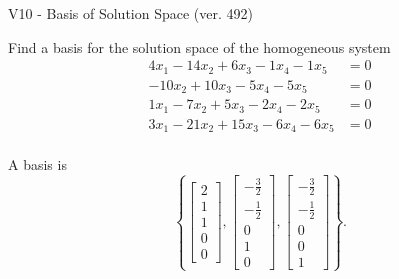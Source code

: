 \begin{exercise}
  \begin{exerciseTitle}V10 - Basis of Solution Space (ver. 492)\end{exerciseTitle}
  \begin{exerciseStatement}
    Find a basis for the solution space of the homogeneous system 
\begin{align*}
 4 x_ 1 -14 x_ 2 + 6 x_ 3 -1 x_ 4 -1 x_ 5 &= 0  \\ 
  -10 x_ 2 + 10 x_ 3 -5 x_ 4 -5 x_ 5 &= 0  \\ 
  1 x_ 1 -7 x_ 2 + 5 x_ 3 -2 x_ 4 -2 x_ 5 &= 0  \\ 
  3 x_ 1 -21 x_ 2 + 15 x_ 3 -6 x_ 4 -6 x_ 5 &= 0  \\ 
 \end{align*}


 
  \end{exerciseStatement}

  \begin{exerciseAnswer}
   A basis is   
\[\left\{\left[\begin{array}{c}
2 \\
1 \\
1 \\
0 \\
0
\end{array}\right] , \left[\begin{array}{c}
-\frac{3}{2} \\
-\frac{1}{2} \\
0 \\
1 \\
0
\end{array}\right] , \left[\begin{array}{c}
-\frac{3}{2} \\
-\frac{1}{2} \\
0 \\
0 \\
1
\end{array}\right]\right\}.\]

  


  \end{exerciseAnswer}
\end{exercise}